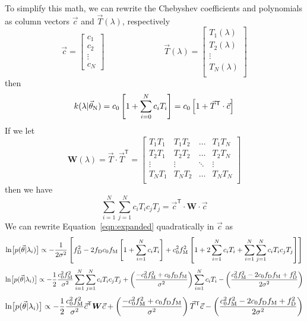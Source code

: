 \documentclass[preprint]{aastex} %
\newcommand{\vt}{\vec{\theta}}
\newcommand{\vN}{\vt_{\rm N}}
\newcommand{\vc}{\vec{c}}
\newcommand{\fM}{f_{\rm M}}
\newcommand{\fD}{f_{\rm D}}
\newcommand{\trans}{\mathsf{T}}
\begin{document}
To simplify this math, we can rewrite the Chebyshev coefficients and polynomials as column vectors $\vc$ and $\vec{T}(\lambda)$, respectively
\begin{equation}
  \vc = 
  \begin{bmatrix}
    c_1\\
    c_2\\
    \vdots\\
    c_N
  \end{bmatrix}
  \hspace{3cm}
\vec{T}(\lambda) = 
\begin{bmatrix}
T_1(\lambda)\\
T_2(\lambda)\\
\vdots\\
T_N(\lambda)\\
\end{bmatrix}
\end{equation}
then 
\begin{equation}
  k(\lambda | \vN) = c_0 \left [ 1 + \sum^N_{i = 0} c_i T_i \right ] = c_0 \left[ 1+ \vec{T}^\trans \cdot \vc \right]
\end{equation}
If we let 
\begin{equation}
  {\bm W}(\lambda) = \vec{T} \cdot \vec{T}^\trans = 
  \begin{bmatrix}
T_1 T_1 & T_1 T_2 &  \hdots & T_1 T_N \\
T_2 T_1 & T_2 T_2 &  \hdots & T_2 T_N \\
\vdots  & \vdots  &  \ddots & \vdots \\
T_N T_1 & T_N T_2 &  \hdots & T_N T_N \\
  \end{bmatrix}
\end{equation}
then we have
\begin{equation}
  \sum_{i =1}^N \sum_{j=1}^N c_i T_i c_j T_j = \vc^\trans \cdot {\bm W} \cdot \vc
\end{equation}
We can rewrite Equation~\ref{eqn:expanded} quadratically in $\vc$ as
\begin{equation}
  \ln \bigl [p(\vt | \lambda_i) \bigr] \propto - \frac{1}{2 \sigma^2} \left [ \fD^2 - 2 \fD c_0 \fM \left [1+ \sum_{i=1}^N c_i T_i \right ]+ c_0^2 \fM^2 \left [1 + 2 \sum_{i=1}^N c_i T_i + \sum_{i=1}^N \sum_{j=1}^N c_i T_i c_j T_j \right ] \right ]
 \end{equation}
\begin{equation}
  \ln \bigl [p(\vt | \lambda_i) \bigr] \propto - \frac{1}{2} \frac{c_0^2 \fM^2}{\sigma^2} \sum_{i=1}^N \sum_{j=1}^N c_i T_i c_j T_j + \left (\frac{- c_0^2 \fM^2 + c_0 \fD \fM}{\sigma^2} \right ) \sum_{i=1}^N c_i T_i  -  \left( \frac{c_0^2 \fM^2 - 2 c_0 \fD \fM + \fD^2}{2 \sigma^2} \right)
\end{equation}
\begin{equation}
  \ln \bigl [p(\vt | \lambda_i) \bigr] \propto - \frac{1}{2} \frac{c_0^2 \fM^2}{\sigma^2}  \vc^\trans {\bm W} \vc + \left (\frac{- c_0^2 \fM^2 + c_0 \fD \fM}{\sigma^2} \right ) \vec{T}^\trans \vc -  \left( \frac{c_0^2 \fM^2 - 2 c_0 \fD \fM + \fD^2}{2 \sigma^2} \right)
\end{equation}
\end{document}
